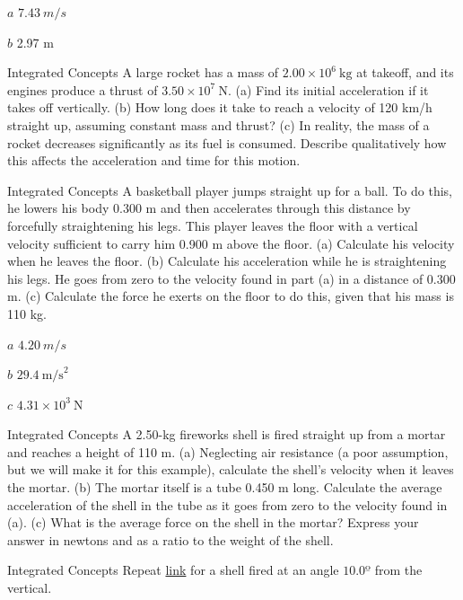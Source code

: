 \documentclass[
]{book}
\begin{document}
\leavevmode{}%
\(a\) \(7.43\ m/s{}\)

\(b\) 2.97 m

\hypertarget{fs-id2441621}{}
\hypertarget{fs-id1446886}{}
{Integrated Concepts} A large rocket has a mass of
\({2\text{.}{\text{00} \times \text{10}^{6}}\ \text{kg}}{}\) at takeoff,
and its engines produce a thrust of
\({3\text{.}{\text{50} \times \text{10}^{7}}\ \text{N}}{}\). (a) Find its
initial acceleration if it takes off vertically. (b) How long does it
take to reach a velocity of 120 km/h straight up, assuming constant mass
and thrust? (c) In reality, the mass of a rocket decreases significantly
as its fuel is consumed. Describe qualitatively how this affects the
acceleration and time for this motion.

\hypertarget{fs-id3065143}{}
\hypertarget{fs-id3065145}{}
{Integrated Concepts} A basketball player jumps
straight up for a ball. To do this, he lowers his body 0.300 m and then
accelerates through this distance by forcefully straightening his legs.
This player leaves the floor with a vertical velocity sufficient to
carry him 0.900 m above the floor. (a) Calculate his velocity when he
leaves the floor. (b) Calculate his acceleration while he is
straightening his legs. He goes from zero to the velocity found in part
(a) in a distance of 0.300 m. (c) Calculate the force he exerts on the
floor to do this, given that his mass is 110 kg.

\leavevmode{}%
\(a\) \(4.20\ m/s{}\)

\(b\) \({\text{29.4}\ \text{m/s}^{2}}{}\)

\(c\) \({4\text{.}{\text{31} \times \text{10}^{3}}\ \text{N}}{}\)

\hypertarget{fs-id3178018}{}
\hypertarget{fs-id2991158}{}
{Integrated Concepts} A 2.50-kg fireworks shell is
fired straight up from a mortar and reaches a height of 110 m. (a)
Neglecting air resistance (a poor assumption, but we will make it for
this example), calculate the shell's velocity when it leaves the mortar.
(b) The mortar itself is a tube 0.450 m long. Calculate the average
acceleration of the shell in the tube as it goes from zero to the
velocity found in (a). (c) What is the average force on the shell in the
mortar? Express your answer in newtons and as a ratio to the weight of
the shell.

\hypertarget{fs-id2963222}{}
\hypertarget{fs-id3253390}{}
{Integrated Concepts} Repeat
\protect\hyperlink{fs-id3178018}{link} for a shell fired at an
angle \(\text{10.0º}{}\) from the vertical.
\end{document}
